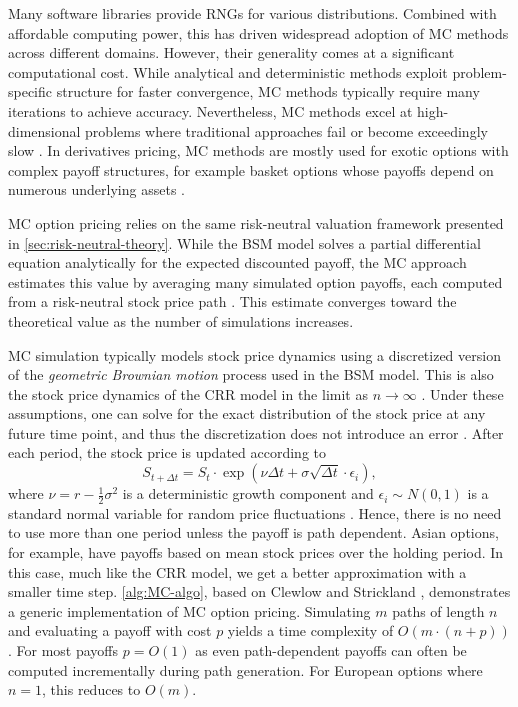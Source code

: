 \documentclass[english,12pt,a4paper,pdftex,sci,utf8]{aaltothesis}
\begin{document}
Many software libraries provide RNGs for various distributions. Combined with affordable computing power, this has driven widespread adoption of MC methods across different domains. However, their generality comes at a significant computational cost. While analytical and deterministic methods exploit problem-specific structure for faster convergence, MC methods typically require many iterations to achieve accuracy. Nevertheless, MC methods excel at high-dimensional problems where traditional approaches fail or become exceedingly slow \cite{gentle2003random}. In derivatives pricing, MC methods are mostly used for exotic options with complex payoff structures, for example basket options whose payoffs depend on numerous underlying assets \cite{hull2016options,wilmott2013paul}.

MC option pricing relies on the same risk-neutral valuation framework presented in \cref{sec:risk-neutral-theory}. While the BSM model solves a partial differential equation analytically for the expected discounted payoff, the MC approach estimates this value by averaging many simulated option payoffs, each computed from a risk-neutral stock price path \cite{boyle1977options}. This estimate converges toward the theoretical value as the number of simulations increases.

MC simulation typically models stock price dynamics using a discretized version of the \emph{geometric Brownian motion} process used in the BSM model. This is also the stock price dynamics of the CRR model in the limit as $n \rightarrow \infty$ \cite{cox1979option}. Under these assumptions, one can solve for the exact distribution of the stock price at any future time point, and thus the discretization does not introduce an error \cite{clewlow1998implementing}. After each period, the stock price is updated according to
\begin{equation*}
S_{t+\Delta t} = S_t \cdot \exp \left( \nu \Delta t + \sigma \sqrt{\Delta t} \cdot \epsilon_i \right),
\label{eq:GBM-price}
\end{equation*}
where $\nu=r-\frac{1}{2}\sigma^2$ is a deterministic growth component and $\epsilon_i \sim N(0,1)$ is a standard normal variable for random price fluctuations \cite{clewlow1998implementing}. Hence, there is no need to use more than one period unless the payoff is path dependent. Asian options, for example, have payoffs based on mean stock prices over the holding period. In this case, much like the CRR model, we get a better approximation with a smaller time step. \cref{alg:MC-algo}, based on Clewlow and Strickland \cite{clewlow1998implementing}, demonstrates a generic implementation of MC option pricing. Simulating $m$ paths of length $n$ and evaluating a payoff with cost $p$ yields a time complexity of $O(m \cdot (n+p))$. For most payoffs $p=O(1)$ as even path-dependent payoffs can often be computed incrementally during path generation. For European options where $n=1$, this reduces to $O(m)$.
\end{document}
